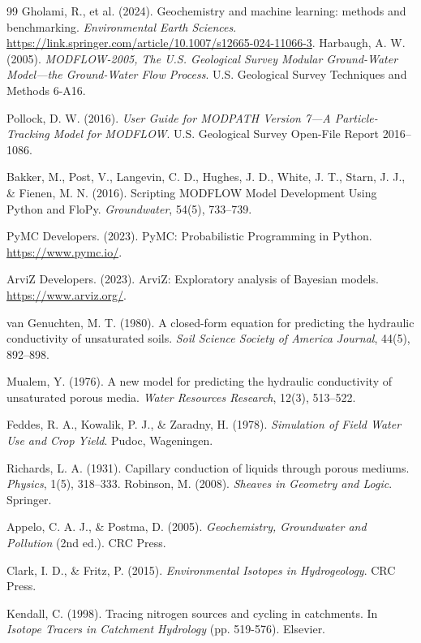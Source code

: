 \documentclass[12pt,a4paper]{article}
\theoremstyle{plain}
\theoremstyle{definition}
\theoremstyle{remark}
\begin{document}
\begin{thebibliography}{99}
	Gholami, R., et al. (2024). Geochemistry and machine learning: methods and benchmarking. \textit{Environmental Earth Sciences}. \url{https://link.springer.com/article/10.1007/s12665-024-11066-3}.
	Harbaugh, A. W. (2005). \textit{MODFLOW-2005, The U.S. Geological Survey Modular Ground-Water Model---the Ground-Water Flow Process}. U.S. Geological Survey Techniques and Methods 6-A16.

	Pollock, D. W. (2016). \textit{User Guide for MODPATH Version 7---A Particle-Tracking Model for MODFLOW}. U.S. Geological Survey Open-File Report 2016--1086.

	Bakker, M., Post, V., Langevin, C. D., Hughes, J. D., White, J. T., Starn, J. J., \& Fienen, M. N. (2016). Scripting MODFLOW Model Development Using Python and FloPy. \textit{Groundwater}, 54(5), 733--739.

	PyMC Developers. (2023). PyMC: Probabilistic Programming in Python. \url{https://www.pymc.io/}.

	ArviZ Developers. (2023). ArviZ: Exploratory analysis of Bayesian models. \url{https://www.arviz.org/}.

	van Genuchten, M. T. (1980). A closed-form equation for predicting the hydraulic conductivity of unsaturated soils. \textit{Soil Science Society of America Journal}, 44(5), 892--898.

	Mualem, Y. (1976). A new model for predicting the hydraulic conductivity of unsaturated porous media. \textit{Water Resources Research}, 12(3), 513--522.

	Feddes, R. A., Kowalik, P. J., \& Zaradny, H. (1978). \textit{Simulation of Field Water Use and Crop Yield}. Pudoc, Wageningen.

	Richards, L. A. (1931). Capillary conduction of liquids through porous mediums. \textit{Physics}, 1(5), 318--333.
	Robinson, M. (2008). \textit{Sheaves in Geometry and Logic}. Springer.

	Appelo, C. A. J., \& Postma, D. (2005). \textit{Geochemistry, Groundwater and Pollution} (2nd ed.). CRC Press.

	Clark, I. D., \& Fritz, P. (2015). \textit{Environmental Isotopes in Hydrogeology}. CRC Press.

	Kendall, C. (1998). Tracing nitrogen sources and cycling in catchments. In \textit{Isotope Tracers in Catchment Hydrology} (pp. 519-576). Elsevier.


\end{thebibliography}
\end{document}
